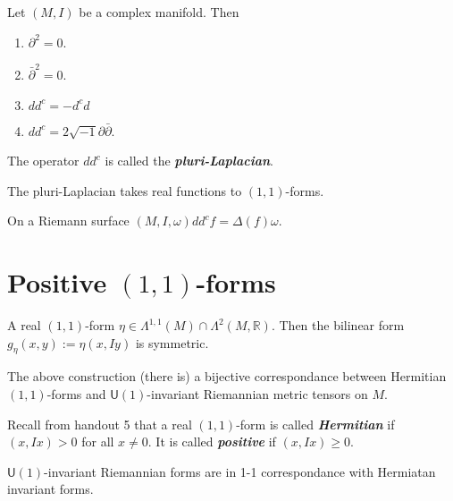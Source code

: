 \begin{thm}\leavevmode
	Let $(M,I)$ be a complex manifold. Then
	 \begin{enumerate}
		\item $\partial^2=0$.
		\item $\bar\partial^2=0$.
		\item $dd^c=-d^cd$ 
		\item $d d^c=2\sqrt{-1}\partial \bar\partial$.
	\end{enumerate}
\end{thm}

\begin{defn}\leavevmode
	The  operator $d d^c$ is called the \textit{\textbf{pluri-Laplacian}}.
\end{defn}

\begin{remark}\leavevmode
	The pluri-Laplacian takes real functions to $(1,1)$-forms.
\end{remark}

\begin{exercise}\leavevmode
	On a Riemann surface $(M,I,\omega)$$d d^cf=\Delta(f)\omega$.
\end{exercise}

\section{Positive $(1,1)$-forms}

\begin{claim}\leavevmode
	A real $(1,1)$-form $\eta \in\Lambda^{1,1}(M)\cap \Lambda^{2}(M,\mathbb{R})$. Then the bilinear form $g_{\eta}(x,y):=\eta(x,Iy)$ is symmetric.
\end{claim}

\begin{remark}\leavevmode
	The above construction (there is) a bijective correspondance between Hermitian $(1,1)$-forms and $\mathsf{U}(1)$-invariant Riemannian metric tensors on $M$.
\end{remark}

\begin{defn}\leavevmode
	Recall from handout 5 that a real $(1,1)$-form is called \textit{\textbf{Hermitian}} if $(x,Ix)>0$ for all  $x\neq 0$. It is called \textit{\textbf{positive}} if $(x,Ix)\geq 0$.
\end{defn}

\begin{remark}\leavevmode
	$\mathsf{U}(1)$-invariant Riemannian forms are in 1-1 correspondance with Hermiatan invariant forms.
\end{remark}

